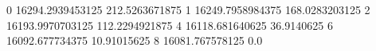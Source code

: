 0 16294.2939453125 212.5263671875
1 16249.7958984375 168.0283203125
2 16193.9970703125 112.2294921875
4 16118.681640625 36.9140625
6 16092.677734375 10.91015625
8 16081.767578125 0.0
